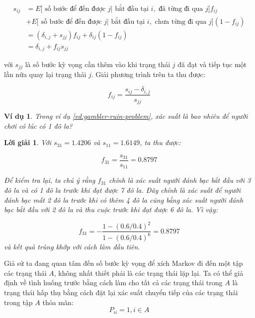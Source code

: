 \documentclass[14pt, a4paper]{article}
\numberwithin{equation}{section}
\numberwithin{figure}{section}
\theoremstyle{sltheorem}
\newtheorem{vd}{Ví dụ}
\theoremstyle{soltheorem}
\newtheorem*{loigiai}{Lời giải}
\numberwithin{dl}{section}
\numberwithin{vd}{section}
\begin{document}
    \begin{equation*}
        \begin{aligned}
            s_{ij} &= E \lbrack \text{ số bước để đến được } j \vert \text{ bắt đầu tại } i, \text{ đã từng đi qua } j \rbrack f_{ij} \\ & + E \lbrack \text{ số bước để đến được } j \vert \text{ bắt đầu tại } i, \text{ chưa từng đi qua } j \rbrack (1 - f_{ij}) \\
            &= (\delta_{i, j} + s_{{jj}}) f_{ij} + \delta_{ij}(1 - f_{ij}) \\
            &= \delta_{i,j} + f_{ij} s_{jj}
        \end{aligned}
    \end{equation*}

    với $s_{jj}$ là số bước kỳ vọng cần thêm vào khi trạng thái $j$ đã đạt và tiếp tục một lần nữa quay lại trạng thái $j$.
    Giải phương trình trên ta thu được:

    \begin{equation*}
        f_{ij} = \dfrac{s_{ij} - \delta_{i,j}}{s_{jj}}
    \end{equation*}

    \begin{vd}
        Trong ví dụ \ref{vd:gambler-ruin-problem}, xác suất là bao nhiêu để người chơi có lúc có 1 đô la?
    \end{vd}

    \begin{loigiai}
        Với $s_{31}=1.4206$ và $s_{11}=1.6149$, ta thu được:
        
        \begin{equation*}
            f_{31} = \dfrac{s_{31}}{s_{11}}=0.8797
        \end{equation*}

        Để kiểm tra lại, ta chú ý rằng $f_{31}$ chính là xác suất người đánh bạc bắt đầu với 3 đô la và có 1 đô la trước khi đạt được 7 đô la.
        Đây chính là xác suất để người đánh bạc mất 2 đô la trước khi có thêm 4 đô la cũng bằng xác suất người đánh bạc bắt đầu với 2 đô la và thu cuộc trước khi đạt được 6 đô la.
        Vì vậy:

        \begin{equation*}
            f_{31} = - \dfrac{1 - (0.6/0.4)^2}{1-(0.6/0.4)^6}=0.8797
        \end{equation*}
        và kết quả trùng khớp với cách làm đầu tiên.
    \end{loigiai}

    Giả sử ta đang quan tâm đến số bước kỳ vọng để xích Markov đi đến một tập các trạng thái $A$, không nhất thiết phải là các trạng thái lặp lại.
    Ta có thể giả định về tình huống trước bằng cách làm cho tất cả các trạng thái trong $A$ là trạng thái hấp thụ bằng cách đặt lại xác suất chuyển tiếp của các trạng thái trong tập $A$ thỏa mãn:
    \begin{equation*}
        P_{ii} = 1, i \in A
    \end{equation*}
\end{document}
